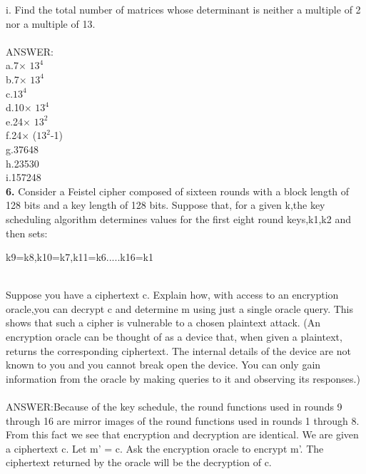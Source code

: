 \documentclass[paper=a4, fontsize=11pt]{scrartcl} %
\numberwithin{equation}{section} %
\numberwithin{figure}{section} %
\numberwithin{table}{section} %
\begin{document}
i. Find the total number of matrices whose determinant is neither a multiple of 2 nor a multiple of 13.\\
\\
ANSWER:\\
    a.7$\times$ $13^{4}$\\
        b.7$\times$ $13^{4}$\\
        c.$13^{4}$\\
        d.10$\times$ $13^{4}$\\
        e.24$\times$ $13^{2}$\\
        f.24$\times$ ($13^{2}$-1)\\
        g.37648\\
        h.23530\\
        i.157248\\

\textbf{6.} Consider a Feistel cipher composed of sixteen rounds with a block length of 128 bits and a key length of 128 bits. Suppose that, for a given k,the key scheduling algorithm determines values for the first eight round keys,k1,k2 and then sets:\\
\centerline{k9=k8,k10=k7,k11=k6.....k16=k1}\\
Suppose you have a ciphertext c. Explain how, with access to an encryption oracle,you can decrypt c and determine m using just a single oracle query. This shows that such a cipher is vulnerable to a chosen plaintext attack. (An encryption oracle can be thought of as a device that, when given a plaintext, returns the corresponding ciphertext. The internal details of the device are not known to you and you cannot break open the device. You can only gain information from the oracle by making queries to it and observing its responses.)\\
\\
ANSWER:Because of the key schedule, the round functions used in rounds 9 through 16 are mirror images of the round functions used in rounds 1 through 8. From this fact we see that encryption and decryption are identical. We are given a ciphertext c. Let m' = c. Ask the encryption oracle to encrypt m'. The ciphertext returned by the oracle will be the decryption of c.\\
\end{document}
